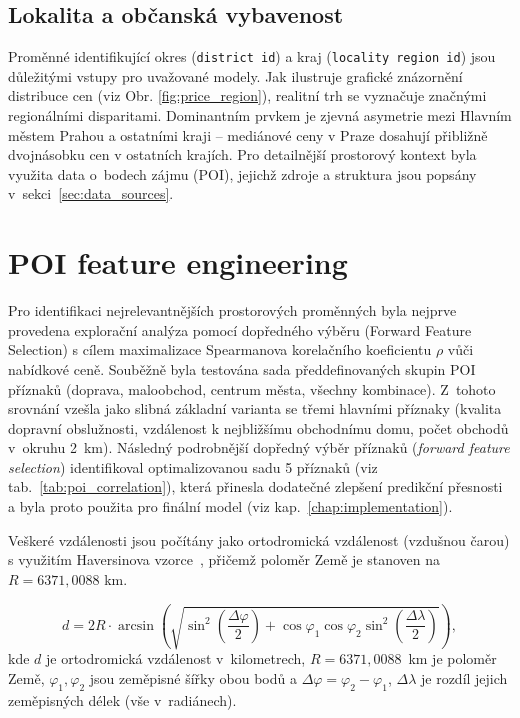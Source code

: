 \subsection{Lokalita a občanská vybavenost}

Proměnné identifikující okres (\texttt{district id}) a kraj (\texttt{locality region id}) jsou důležitými vstupy pro uvažované modely. Jak ilustruje grafické znázornění distribuce cen (viz Obr. \ref{fig:price_region}), realitní trh se vyznačuje značnými regionálními disparitami. Dominantním prvkem je zjevná asymetrie mezi Hlavním městem Prahou a ostatními kraji -- mediánové ceny v Praze dosahují přibližně dvojnásobku cen v ostatních krajích. 
Pro detailnější prostorový kontext byla využita data o~bodech zájmu (POI), jejichž zdroje a struktura jsou popsány v~sekci~\ref{sec:data_sources}.


\section{POI feature engineering}\label{sec:poi_feature_engineering}

Pro identifikaci nejrelevantnějších prostorových proměnných byla nejprve provedena explorační analýza pomocí dopředného výběru (Forward Feature Selection) s cílem maximalizace Spearmanova korelačního koeficientu \(\rho\) vůči nabídkové ceně. Souběžně byla testována sada předdefinovaných skupin POI příznaků (doprava, maloobchod, centrum města, všechny kombinace). Z~tohoto srovnání vzešla jako slibná základní varianta se třemi hlavními příznaky (kvalita dopravní obslužnosti, vzdálenost k nejbližšímu obchodnímu domu, počet obchodů v~okruhu 2~km). Následný podrobnější dopředný výběr příznaků (\textit{forward feature selection}) identifikoval optimalizovanou sadu 5 příznaků (viz tab.~\ref{tab:poi_correlation}), která přinesla dodatečné zlepšení predikční přesnosti a byla proto použita pro finální model (viz kap.~\ref{chap:implementation}).

Veškeré vzdálenosti jsou počítány jako ortodromická vzdálenost (vzdušnou čarou) s využitím Haversinova vzorce~\cite{Sinnott1984Haversine}, přičemž poloměr Země je stanoven na \(R = 6371{,}0088\) km.

\begin{equation}
d = 2R \cdot \arcsin\!\left(\sqrt{\sin^2\!\left(\frac{\Delta\varphi}{2}\right) + \cos\varphi_1 \cos\varphi_2 \sin^2\!\left(\frac{\Delta\lambda}{2}\right)}\right),
\end{equation}
kde \(d\) je ortodromická vzdálenost v~kilometrech, \(R = 6371{,}0088\)~km je poloměr Země, \(\varphi_1, \varphi_2\) jsou zeměpisné šířky obou bodů a \(\Delta\varphi = \varphi_2 - \varphi_1\), \(\Delta\lambda\) je rozdíl jejich zeměpisných délek (vše v~radiánech).

